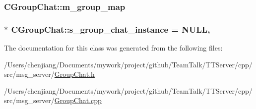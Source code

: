 \subsubsection[{m\+\_\+group\+\_\+map}]{ C\+Group\+Chat\+::m\+\_\+group\+\_\+map\hspace{0.3cm}{\ttfamily [private]}}\label{class_c_group_chat_aaf58545f7641af48cdbc36f68521aefb}
\hypertarget{class_c_group_chat_a32fd8d5da425d8b8da7a4e91127574ce}{}
\subsubsection[{s\+\_\+group\+\_\+chat\+\_\+instance}]{ $\ast$ C\+Group\+Chat\+::s\+\_\+group\+\_\+chat\+\_\+instance = N\+U\+L\+L\hspace{0.3cm}{\ttfamily [static]}, {\ttfamily [private]}}\label{class_c_group_chat_a32fd8d5da425d8b8da7a4e91127574ce}


The documentation for this class was generated from the following files\+:\begin{DoxyCompactItemize}
\item 
/\+Users/chenjiang/\+Documents/mywork/project/github/\+Team\+Talk/\+T\+T\+Server/cpp/src/msg\+\_\+server/\hyperlink{_group_chat_8h}{Group\+Chat.\+h}\item 
/\+Users/chenjiang/\+Documents/mywork/project/github/\+Team\+Talk/\+T\+T\+Server/cpp/src/msg\+\_\+server/\hyperlink{_group_chat_8cpp}{Group\+Chat.\+cpp}\end{DoxyCompactItemize}
